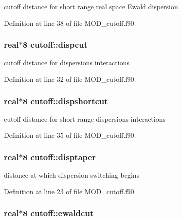 cutoff distance for short range real space Ewald dispersion 



Definition at line 38 of file M\-O\-D\-\_\-cutoff.\-f90.

\hypertarget{classcutoff_a7e03361a39f7572ebf5c29e5ecad9206}{
\subsubsection[{dispcut}]{\setlength{\rightskip}{0pt plus 5cm}real$\ast$8 cutoff\-::dispcut}}\label{classcutoff_a7e03361a39f7572ebf5c29e5ecad9206}


cutoff distance for dispersions interactions 



Definition at line 32 of file M\-O\-D\-\_\-cutoff.\-f90.

\hypertarget{classcutoff_a0f4daf222ec1e5bac9d2906f645a802c}{
\subsubsection[{dispshortcut}]{\setlength{\rightskip}{0pt plus 5cm}real$\ast$8 cutoff\-::dispshortcut}}\label{classcutoff_a0f4daf222ec1e5bac9d2906f645a802c}


cutoff distance for short range dispersions interactions 



Definition at line 35 of file M\-O\-D\-\_\-cutoff.\-f90.

\hypertarget{classcutoff_a74f0ed5f2cad112e7fe50f24904d9e89}{
\subsubsection[{disptaper}]{\setlength{\rightskip}{0pt plus 5cm}real$\ast$8 cutoff\-::disptaper}}\label{classcutoff_a74f0ed5f2cad112e7fe50f24904d9e89}


distance at which dispersion switching begins 



Definition at line 23 of file M\-O\-D\-\_\-cutoff.\-f90.

\hypertarget{classcutoff_a5130b26d222b11d50434f8479f00cf6a}{
\subsubsection[{ewaldcut}]{\setlength{\rightskip}{0pt plus 5cm}real$\ast$8 cutoff\-::ewaldcut}}\label{classcutoff_a5130b26d222b11d50434f8479f00cf6a}


